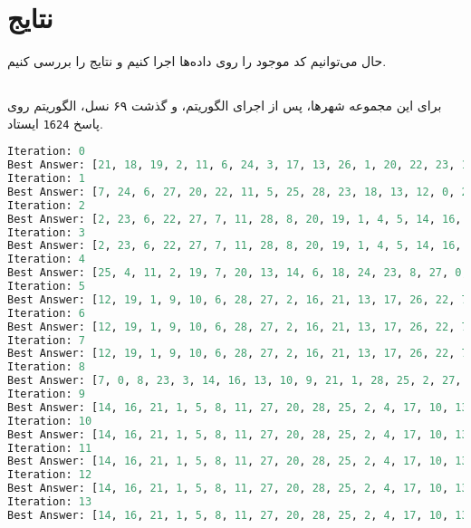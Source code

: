 \documentclass[a4paper, 12pt]{article}
\theoremstyle{definition}
\begin{document}
\section{نتایج}

حال می‌توانیم کد موجود را روی داده‌ها اجرا کنیم و نتایج را بررسی کنیم.

\subsection{}
برای این مجموعه شهرها، پس از اجرای الگوریتم، و گذشت ۶۹ نسل، الگوریتم روی پاسخ
\texttt{1624}
ایستاد.

\LTR
\begin{lstlisting}[language=Python]
Iteration: 0
Best Answer: [21, 18, 19, 2, 11, 6, 24, 3, 17, 13, 26, 1, 20, 22, 23, 12, 7, 14, 10, 15, 27, 8, 9, 0, 28, 25, 4, 5, 16]: 3617
Iteration: 1
Best Answer: [7, 24, 6, 27, 20, 22, 11, 5, 25, 28, 23, 18, 13, 12, 0, 26, 2, 4, 8, 14, 17, 15, 19, 1, 9, 3, 21, 16, 10]: 3531
Iteration: 2
Best Answer: [2, 23, 6, 22, 27, 7, 11, 28, 8, 20, 19, 1, 4, 5, 14, 16, 13, 10, 9, 21, 18, 26, 17, 3, 12, 0, 24, 15, 25]: 3392
Iteration: 3
Best Answer: [2, 23, 6, 22, 27, 7, 11, 28, 8, 20, 19, 1, 4, 5, 14, 16, 13, 10, 9, 21, 18, 26, 17, 3, 12, 0, 24, 15, 25]: 3392
Iteration: 4
Best Answer: [25, 4, 11, 2, 19, 7, 20, 13, 14, 6, 18, 24, 23, 8, 27, 0, 5, 21, 17, 16, 10, 9, 1, 15, 26, 22, 3, 12, 28]: 3328
Iteration: 5
Best Answer: [12, 19, 1, 9, 10, 6, 28, 27, 2, 16, 21, 13, 17, 26, 22, 7, 5, 0, 25, 4, 11, 8, 20, 3, 14, 24, 23, 15, 18]: 3115
Iteration: 6
Best Answer: [12, 19, 1, 9, 10, 6, 28, 27, 2, 16, 21, 13, 17, 26, 22, 7, 5, 0, 25, 4, 11, 8, 20, 3, 14, 24, 23, 15, 18]: 3115
Iteration: 7
Best Answer: [12, 19, 1, 9, 10, 6, 28, 27, 2, 16, 21, 13, 17, 26, 22, 7, 5, 0, 25, 4, 11, 8, 20, 3, 14, 24, 23, 15, 18]: 3115
Iteration: 8
Best Answer: [7, 0, 8, 23, 3, 14, 16, 13, 10, 9, 21, 1, 28, 25, 2, 27, 11, 5, 4, 20, 6, 22, 24, 15, 18, 12, 19, 17, 26]: 2954
Iteration: 9
Best Answer: [14, 16, 21, 1, 5, 8, 11, 27, 20, 28, 25, 2, 4, 17, 10, 13, 19, 26, 22, 7, 0, 23, 15, 12, 9, 18, 6, 24, 3]: 2600
Iteration: 10
Best Answer: [14, 16, 21, 1, 5, 8, 11, 27, 20, 28, 25, 2, 4, 17, 10, 13, 19, 26, 22, 7, 0, 23, 15, 12, 9, 18, 6, 24, 3]: 2600
Iteration: 11
Best Answer: [14, 16, 21, 1, 5, 8, 11, 27, 20, 28, 25, 2, 4, 17, 10, 13, 19, 26, 22, 7, 0, 23, 15, 12, 9, 18, 6, 24, 3]: 2600
Iteration: 12
Best Answer: [14, 16, 21, 1, 5, 8, 11, 27, 20, 28, 25, 2, 4, 17, 10, 13, 19, 26, 22, 7, 0, 23, 15, 12, 9, 18, 6, 24, 3]: 2600
Iteration: 13
Best Answer: [14, 16, 21, 1, 5, 8, 11, 27, 20, 28, 25, 2, 4, 17, 10, 13, 19, 26, 22, 7, 0, 23, 15, 12, 9, 18, 6, 24, 3]: 2600

\end{lstlisting}
\end{document}
